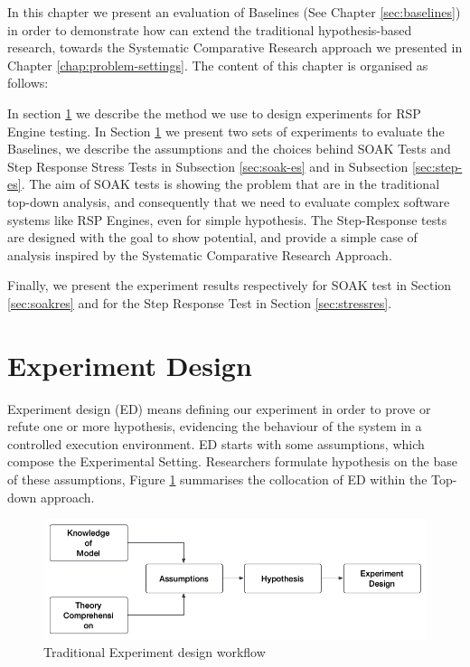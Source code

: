 In this chapter we present an evaluation of \name Baselines (See Chapter \ref{sec:baselines}) in order to demonstrate how \name can extend the traditional hypothesis-based research, towards the Systematic Comparative Research approach we presented in Chapter \ref{chap:problem-settings}. The content of this chapter is organised as follows:

In section \ref{sec:experiment-design} we describe the method we use to design experiments for RSP Engine testing. In Section \ref{sec:experiment-design} we present two sets of experiments to evaluate the Baselines, we describe the assumptions and the choices behind SOAK Tests and Step Response Stress Tests in Subsection \ref{sec:soak-es} and in Subsection \ref{sec:step-es}. The aim of SOAK tests is showing the problem that are in the traditional top-down analysis, and consequently that we need \name to evaluate complex software systems like RSP Engines, even for simple hypothesis.  The Step-Response tests are designed with the goal to show \name potential, and provide a simple case of analysis inspired by the Systematic Comparative Research Approach.

Finally, we present the experiment results respectively for SOAK test in Section \ref{sec:soakres} and for the Step Response Test in Section \ref{sec:stressres}.

\section{Experiment Design}\label{sec:experiment-design}

Experiment design (ED) means defining our experiment in order to prove or refute one or more hypothesis, evidencing the behaviour of the system in a controlled execution environment. ED starts with some assumptions, which compose the  Experimental Setting. Researchers formulate hypothesis on the base of these assumptions, Figure \ref{fig:experiment-design} summarises the collocation of ED within the Top-down approach.

\begin{figure}[tbh]
  \centering
	\includegraphics[width=\linewidth]{images/experiment-design}
	\caption{Traditional Experiment design workflow} 
  	\label{fig:experiment-design}
\end{figure}


